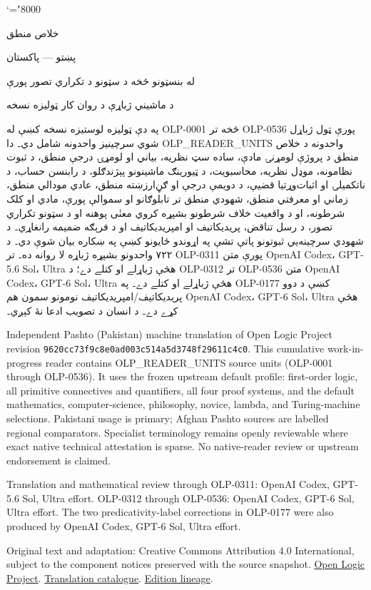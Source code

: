 \documentclass[11pt,a4paper,oneside]{report}
\theoremstyle{definition}
\begin{document}
\setRTL
\mathcode`\!="8000
\begin{titlepage}
\thispagestyle{empty}
\begin{center}
\vspace*{22mm}
{\Huge خلاص منطق}\par\bigskip
{\Large پښتو — پاکستان}\par\bigskip
{\LARGE له بنسټونو څخه د سټونو د تکراري تصور پورې}\par\bigskip
د ماشيني ژباړې د روان کار ټوليزه نسخه
\end{center}
\bigskip
په دې ټوليزه لوستيزه نسخه کښې له OLP-0001 څخه تر OLP-0536 پورې
ټول ژباړل شوي سرچينيز واحدونه شامل دي۔ دا OLP_READER_UNITS واحدونه د
خلاص منطق د پروژې لومړنۍ مادې، ساده سټ نظريه، بياني او لومړۍ درجې
منطق، د ثبوت نظامونه، موډل نظريه، محاسبويت، د ټيورينګ ماشينونو
پېژندګلو، د رابنسن حساب، د ناتکميلۍ او اثبات‌وړتيا قضيې، د دويمې درجې او
ګڼ‌ارزښته منطق، عادي مودالي منطق، زماني او معرفتي منطق، شهودي منطق
تر تابلوګانو او سموالې پورې، مادي او کلک شرطونه، او د واقعيت خلاف
شرطونو بشپړه کروي معنٰی پوهنه او د سټونو تکراري تصور،
د رسل تناقض، پريديکاتيف او امپريديکاتيف او د فرېګه ضميمه رانغاړي۔ د شهودي سرچينه‌يي ثبوتونو پاتې
تشې په اړوندو ځايونو کښې په ښکاره بيان شوې دي۔
د ۷۲۲ واحدونو بشپړه ژباړه لا روانه ده۔ تر OLP-0311 پورې متن
OpenAI Codex، GPT-5.6 Sol، Ultra هڅې ژباړلے او کتلے دے؛
د OLP-0312 تر OLP-0536 متن OpenAI Codex، GPT-6 Sol، Ultra
هڅې ژباړلے او کتلے دے۔ په OLP-0177 کښې د دوو پريديکاتيف/امپريديکاتيف
نومونو سمون هم OpenAI Codex، GPT-6 Sol، Ultra هڅې کړے دے۔
د انسان د تصويب ادعا نۀ کېږي۔

\begin{LTR}\latinfont\small
Independent Pashto (Pakistan) machine translation of Open Logic Project
revision \texttt{9620cc73f9c8e0ad003c514a5d3748f29611c4c0}. This cumulative
work-in-progress reader contains OLP_READER_UNITS source units (OLP-0001
through OLP-0536). It uses the frozen upstream default profile: first-order
logic, all primitive connectives and quantifiers, all four proof systems,
and the default mathematics, computer-science, philosophy, novice, lambda,
and Turing-machine selections. Pakistani usage is primary; Afghan Pashto
sources are labelled regional comparators. Specialist terminology remains
openly reviewable where exact native technical attestation is sparse. No
native-reader review or upstream endorsement is claimed.

Translation and mathematical review through OLP-0311: OpenAI Codex,
GPT-5.6 Sol, Ultra effort. OLP-0312 through OLP-0536: OpenAI Codex,
GPT-6 Sol, Ultra effort. The two predicativity-label corrections in
OLP-0177 were also produced by OpenAI Codex, GPT-6 Sol, Ultra effort.

Original text and adaptation: Creative Commons Attribution 4.0 International,
subject to the component notices preserved with the source snapshot.
\href{https://openlogicproject.org/}{Open Logic Project}.\quad
\href{https://github.com/KokunoYumeto/OpenLogic-translations}{Translation catalogue}.\quad
\href{https://doi.org/10.5281/zenodo.22307197}{Edition lineage}.
\end{LTR}
\end{titlepage}
\tableofcontents
\clearpage
\end{document}
